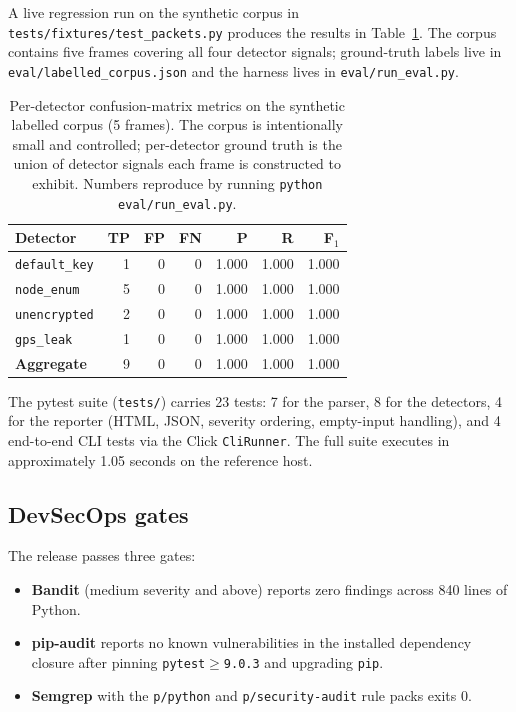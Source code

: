 \documentclass[conference,a4paper,10pt]{IEEEtran}
\begin{document}
A live regression run on the synthetic corpus in
\texttt{tests/fixtures/test\_packets.py} produces the results in
Table~\ref{tab:eval}. The corpus contains five frames covering all
four detector signals; ground-truth labels live in
\texttt{eval/labelled\_corpus.json} and the harness lives in
\texttt{eval/run\_eval.py}.

\begin{table}[!t]
\caption{Per-detector confusion-matrix metrics on the synthetic
labelled corpus (5 frames). The corpus is intentionally small and
controlled; per-detector ground truth is the union of detector
signals each frame is constructed to exhibit. Numbers reproduce by
running \texttt{python eval/run\_eval.py}.}
\label{tab:eval}
\centering
\footnotesize
\begin{tabularx}{\columnwidth}{Xrrrrrr}
\toprule
\textbf{Detector} & \textbf{TP} & \textbf{FP} & \textbf{FN} &
\textbf{P} & \textbf{R} & \textbf{F$_1$} \\
\midrule
\texttt{default\_key}  & 1 & 0 & 0 & 1.000 & 1.000 & 1.000 \\
\texttt{node\_enum}    & 5 & 0 & 0 & 1.000 & 1.000 & 1.000 \\
\texttt{unencrypted}   & 2 & 0 & 0 & 1.000 & 1.000 & 1.000 \\
\texttt{gps\_leak}     & 1 & 0 & 0 & 1.000 & 1.000 & 1.000 \\
\midrule
\textbf{Aggregate}     & 9 & 0 & 0 & 1.000 & 1.000 & 1.000 \\
\bottomrule
\end{tabularx}
\end{table}

The pytest suite (\texttt{tests/}) carries 23 tests: 7 for the
parser, 8 for the detectors, 4 for the reporter (HTML, JSON, severity
ordering, empty-input handling), and 4 end-to-end CLI tests via the
Click \texttt{CliRunner}. The full suite executes in approximately
1.05 seconds on the reference host.

\subsection{DevSecOps gates}

The release passes three gates:

\begin{itemize}
  \item \textbf{Bandit} (medium severity and above) reports zero
    findings across 840 lines of Python.
  \item \textbf{pip-audit} reports no known vulnerabilities in the
    installed dependency closure after pinning \texttt{pytest$\geq$9.0.3}
    and upgrading \texttt{pip}.
  \item \textbf{Semgrep} with the \texttt{p/python} and
    \texttt{p/security-audit} rule packs exits 0.
\end{itemize}
\end{document}
